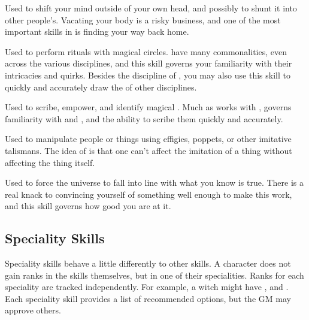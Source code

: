Used to shift your mind outside of your own head, and possibly to shunt it into other people's.
Vacating your body is a risky business, and one of the most important skills in  is finding your way back home.


Used to perform rituals with magical circles.
 have many commonalities, even across the various disciplines, and this skill governs your familiarity with their intricacies and quirks.
Besides the discipline of , you may also use this skill to quickly and accurately draw the  of other disciplines.


Used to scribe, empower, and identify magical {\sigils}.
Much as  works with ,  governs familiarity with {\sigils} and {\sigilmarks}, and the ability to scribe them quickly and accurately.


Used to manipulate people or things using effigies, poppets, or other imitative talismans.
The idea of  is that one can't affect the imitation of a thing without affecting the thing itself.


Used to force the universe to fall into line with what you know is true.
There is a real knack to convincing yourself of something well enough to make this work, and this skill governs how good you are at it.

\subsection{Speciality Skills}

Speciality skills behave a little differently to other skills.
A character does not gain ranks in the skills themselves, but in one of their specialities.
Ranks for each speciality are tracked independently.
For example, a witch might have ,  and .
Each speciality skill provides a list of recommended options, but the GM may approve others.

